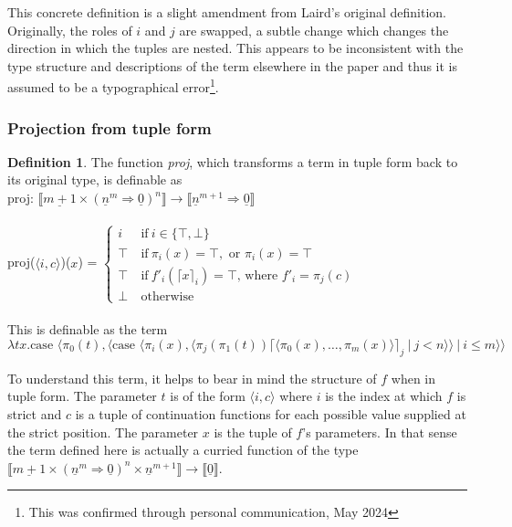 \documentclass[12pt,a4paper]{report}
\theoremstyle{definition}
\theoremstyle{definition}
\newtheorem{definition}{Definition}[chapter]%
\theoremstyle{remark}
\begin{document}
This concrete definition is a slight amendment from Laird's original definition. Originally, the roles of $i$ and $j$ are swapped, a subtle change which changes the direction in which the tuples are nested. This appears to be inconsistent with the type structure and descriptions of the term elsewhere in the paper and thus it is assumed to be a typographical error\footnote{This was confirmed through personal communication, May 2024}.

\subsubsection{Projection from tuple form}
\begin{definition}\label{def:proj}
    The function \emph{proj}, which transforms a term in tuple form back to its original type, is definable as \\
    proj: $\llbracket \underline{m + 1} \times (\underline{n}^{m} \Rightarrow \underline{0})^n \rrbracket \rightarrow \llbracket \underline{n}^{m+1} \Rightarrow \underline{0} \rrbracket$\\\\
    proj($\langle i, c\rangle$)($x$) =
    $\begin{cases}
        i\ &\text{if}\ i \in \{\top, \bot\}\\
        \top\ &\text{if}\ \pi_i(x) = \top, \text{ or } \pi_i(x) = \top\\
        \top\ &\text{if}\ f'_i(\lceil x \rceil_i) = \top \text{, where } f'_i = \pi_j(c)\\
        \bot\ &\text{otherwise}
    \end{cases}$\\\\
    This is definable as the term
    \[
    \lambda tx. \text{case } \langle \pi_0(t), \langle \text{case } \langle \pi_i(x), \langle \pi_j(\pi_1(t)) \lceil \langle \pi_0(x), \dots, \pi_m(x)\rangle\rceil_j\ | \ j < n \rangle \rangle\ |\ i \leq m \rangle \rangle
    \]
\end{definition}

To understand this term, it helps to bear in mind the structure of $f$ when in tuple form. The parameter $t$ is of the form $\langle i, c\rangle$ where $i$ is the index at which $f$ is strict and $c$ is a tuple of continuation functions for each possible value supplied at the strict position. The parameter $x$ is the tuple of $f$'s parameters. In that sense the term defined here is actually a curried function of the type $\llbracket \underline{m + 1} \times (\underline{n}^{m} \Rightarrow \underline{0})^n \times \underline{n}^{m+1} \rrbracket \rightarrow \llbracket \underline{0} \rrbracket$.
\end{document}
